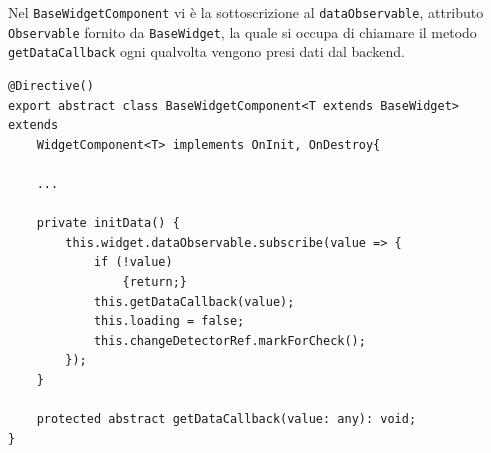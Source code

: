 Nel \verb|BaseWidgetComponent| vi è la sottoscrizione al \verb|dataObservable|, attributo \verb|Observable| fornito da \verb|BaseWidget|, la quale si occupa di chiamare il metodo \verb|getDataCallback| ogni qualvolta vengono presi dati dal backend.
\begin{lstlisting}[caption={Metodi per l'inizializzazione dei dati all'interno della classe BaseWidgetComponent}, style=javaScriptCode]
@Directive()
export abstract class BaseWidgetComponent<T extends BaseWidget> extends 
    WidgetComponent<T> implements OnInit, OnDestroy{

    ...
        
    private initData() {
        this.widget.dataObservable.subscribe(value => {
            if (!value)
                {return;}
            this.getDataCallback(value);
            this.loading = false;
            this.changeDetectorRef.markForCheck();
        });
    }

    protected abstract getDataCallback(value: any): void;
}
\end{lstlisting}

